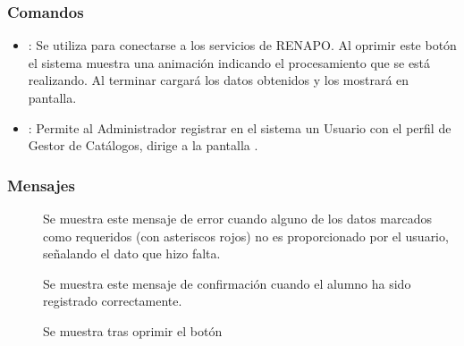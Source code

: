 \subsubsection{Comandos}
    \begin{itemize}
	\item \botCurp: Se utiliza para conectarse a los servicios de RENAPO. Al oprimir este botón el sistema muestra una animación indicando el procesamiento que se está realizando. Al terminar cargará los datos obtenidos y los mostrará en pantalla.
	\item {}: Permite al Administrador registrar en el sistema un Usuario con el perfil de Gestor de Catálogos, dirige a la pantalla .
    \end{itemize}

\subsubsection{Mensajes}

    \begin{description}
	\item[] Se muestra este mensaje de error cuando alguno de los datos marcados como requeridos (con asteriscos rojos) no es proporcionado por el usuario, señalando el dato que hizo falta.
	\item[] Se muestra este mensaje de confirmación cuando el alumno ha sido registrado correctamente.
	\item[] Se muestra tras oprimir el botón \botCurp 
    \end{description}
